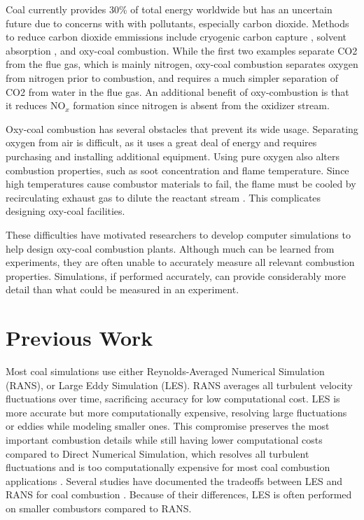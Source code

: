 \documentclass[review,3p]{elsarticle}
\begin{document}

	Coal currently provides 30\% of total energy worldwide \cite{DoE2019} 
but has an uncertain future due to concerns with with pollutants, especially carbon dioxide.  Methods to reduce carbon dioxide emmissions include cryogenic carbon capture \cite{Fazlollahi2015}, solvent absorption \cite{Yang2008}, and oxy-coal combustion.  While the first two examples separate CO2 from the flue gas, which is mainly nitrogen, oxy-coal combustion separates oxygen from nitrogen prior to combustion, and requires a much simpler separation of CO2 from water in the flue gas.   An additional benefit of oxy-combustion is that it reduces NO$_x$ formation since nitrogen is absent from the oxidizer stream.  

	Oxy-coal combustion has several obstacles that prevent its wide usage.  Separating oxygen from air is difficult, as it uses a great deal of energy and requires purchasing and installing additional equipment.  Using pure oxygen also alters combustion properties, such as soot concentration and flame temperature.  Since high temperatures cause combustor materials to fail, the flame must be cooled by recirculating exhaust gas to dilute the reactant stream \cite{Kather2009}.  This complicates designing oxy-coal facilities. 

	These difficulties have motivated researchers to develop computer simulations to help design oxy-coal combustion plants.  Although much can be learned from experiments, they are often unable to accurately measure all relevant combustion properties.  Simulations, if performed accurately, can provide considerably more detail than what could be measured in an experiment.  
 \section{Previous Work}
	 Most coal simulations use either Reynolds-Averaged Numerical Simulation (RANS), or Large Eddy Simulation (LES).  RANS averages all turbulent velocity fluctuations over time, sacrificing accuracy for low computational cost.  LES is more accurate but more computationally expensive, resolving large fluctuations or eddies while modeling smaller ones.  This compromise preserves the most important combustion details while still having lower computational costs compared to Direct Numerical Simulation, which resolves all turbulent fluctuations and is too computationally expensive for most coal combustion applications \citep{Luo2012}.  Several studies have documented the tradeoffs between LES and RANS  for coal combustion \citep{Yamamoto20111771} \citep{Gharebaghi2011} \citep{Edge2011} \citep{Stein2012} \citep{Warzecha2014732}.  Because of their differences, LES is often performed on smaller combustors compared to RANS.    
	
\end{document}
